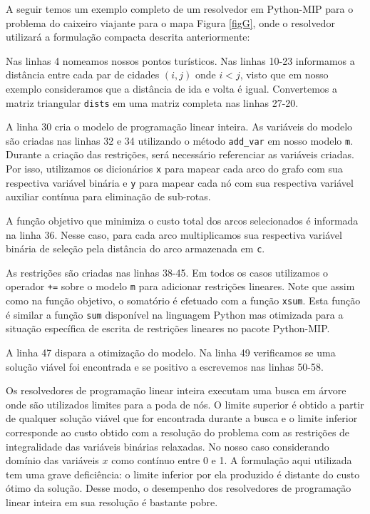 \documentclass[a4paper,11pt,fleqn]{article}
\begin{document}
A seguir temos um exemplo completo de um resolvedor em Python-MIP para o problema do caixeiro viajante para o mapa Figura \ref{figG}, onde o resolvedor utilizará a formulação compacta descrita anteriormente:

{\small

}

Nas linhas 4 nomeamos nossos pontos turísticos. Nas linhas 10-23 informamos a distância entre cada par de cidades $(i, j)$ onde $i<j$, visto que em nosso exemplo consideramos que a distância de ida e volta é igual. Convertemos a matriz triangular \texttt{dists} em uma matriz completa nas linhas 27-20.

A linha 30 cria o modelo de programação linear inteira. As variáveis do modelo são criadas nas linhas 32 e 34 utilizando o método \texttt{add\_var} em nosso modelo \texttt{m}. Durante a criação das restrições, será necessário referenciar as variáveis criadas. Por isso, utilizamos os dicionários \texttt{x} para mapear cada arco do grafo com sua respectiva variável binária e \texttt{y} para mapear cada nó com sua respectiva variável auxiliar contínua para eliminação de sub-rotas.

A função objetivo que minimiza o custo total dos arcos selecionados é informada na linha 36. Nesse caso, para cada arco multiplicamos sua respectiva variável binária de seleção pela distância do arco armazenada em \texttt{c}.

As restrições são criadas nas linhas 38-45. Em todos os casos utilizamos o operador \texttt{+=} sobre o modelo \texttt{m} para adicionar restrições lineares. Note que assim como na função objetivo, o somatório é efetuado com a função \texttt{xsum}. Esta função é similar a função \texttt{sum} disponível na linguagem Python mas otimizada para a situação específica de escrita de restrições lineares no pacote Python-MIP\@. 

A linha 47 dispara a otimização do modelo. Na linha 49 verificamos se uma solução viável foi encontrada e se positivo a escrevemos nas linhas 50-58.

Os resolvedores de programação linear inteira executam uma busca em árvore onde são utilizados limites para a poda de nós. O limite superior é obtido a partir de qualquer solução viável que for encontrada durante a busca e o limite inferior corresponde ao custo obtido com a resolução do problema com as restrições de integralidade das variáveis binárias relaxadas. No nosso caso considerando domínio das variáveis $x$ como contínuo entre 0 e 1. A formulação aqui utilizada tem uma grave deficiência: o limite inferior por ela produzido é distante do custo ótimo da solução. Desse modo, o desempenho dos resolvedores de programação linear inteira em sua resolução é bastante pobre. 
\end{document}
